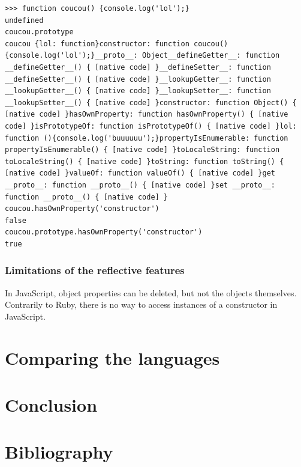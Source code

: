 \documentclass[a4paper,10pt]{article}
\begin{document}
\begin{lstlisting}
>>> function coucou() {console.log('lol');}
undefined
coucou.prototype
coucou {lol: function}constructor: function coucou() {console.log('lol');}__proto__: Object__defineGetter__: function __defineGetter__() { [native code] }__defineSetter__: function __defineSetter__() { [native code] }__lookupGetter__: function __lookupGetter__() { [native code] }__lookupSetter__: function __lookupSetter__() { [native code] }constructor: function Object() { [native code] }hasOwnProperty: function hasOwnProperty() { [native code] }isPrototypeOf: function isPrototypeOf() { [native code] }lol: function (){console.log('buuuuuu');}propertyIsEnumerable: function propertyIsEnumerable() { [native code] }toLocaleString: function toLocaleString() { [native code] }toString: function toString() { [native code] }valueOf: function valueOf() { [native code] }get __proto__: function __proto__() { [native code] }set __proto__: function __proto__() { [native code] }
coucou.hasOwnProperty('constructor')
false
coucou.prototype.hasOwnProperty('constructor')
true
\end{lstlisting}

\subsubsection{Limitations of the reflective features}

In JavaScript, object properties can be deleted, but not the objects themselves.
Contrarily to Ruby, there is no way to access instances of a constructor in JavaScript.




\newpage
\section{Comparing the languages}



\section{Conclusion}



\section{Bibliography}
\end{document}
